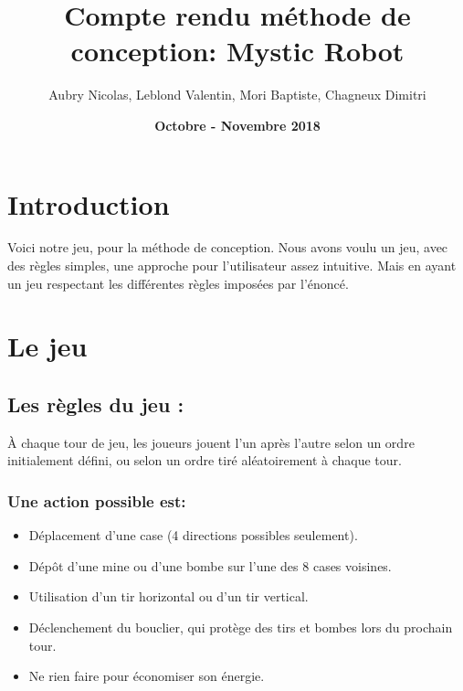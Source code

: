 \documentclass{article}
\title{ \bf Compte rendu méthode de conception:  Mystic Robot}
\author{ Aubry Nicolas, Leblond Valentin, Mori Baptiste, Chagneux Dimitri}
\date{ \bf Octobre - Novembre 2018}
\begin{document}
\maketitle
\tableofcontents

\vspace{5\baselineskip}

\section{Introduction}
Voici notre jeu, pour la méthode de conception. Nous avons voulu un jeu, avec des règles simples, une approche pour l'utilisateur assez intuitive. Mais en ayant un jeu respectant les différentes règles imposées par l'énoncé.

\section{Le jeu }

\subsection{Les règles du jeu : }

À chaque tour de jeu, les joueurs jouent l'un après l'autre selon un ordre initialement défini, ou selon un ordre tiré aléatoirement à chaque tour.

\vspace{1\baselineskip}

\subsubsection{Une action possible est:}

\vspace{1\baselineskip}

\begin{itemize}
    \item  Déplacement d'une case (4 directions possibles seulement).
    \item  Dépôt d'une mine ou d'une bombe sur l'une des 8 cases voisines.
    \item  Utilisation d'un tir horizontal ou d'un tir vertical.
    \item  Déclenchement du bouclier, qui protège des tirs et bombes lors du prochain tour.
    \item  Ne rien faire pour économiser son énergie.
\end{itemize}

\vspace{1\baselineskip}
\end{document}
